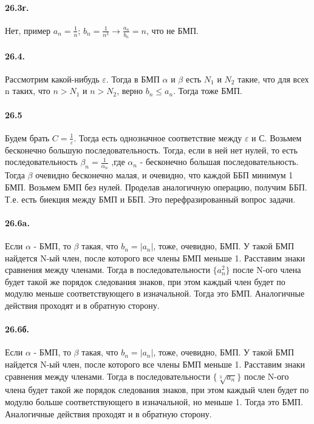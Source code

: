 \documentclass{book}
\begin{document}
\paragraph{26.3г.}
Нет, пример $a_n = \frac{1}{n}$; $b_n =\frac{1}{n^2} \rightarrow \frac{a_n}{b_n} = n$, что не БМП.

\paragraph{26.4.}
Рассмотрим какой-нибудь $\varepsilon$. Тогда в БМП $\alpha$ и $\beta$ есть $N_1$ и $N_2$ такие, что для всех n таких, что $n>N_1$ и $n>N_2$, верно $b_n \le a_n $. Тогда тоже БМП.

\paragraph{26.5}
Будем брать $C = \frac{1}{\varepsilon}$. Тогда есть однозначное соответствие между $\varepsilon$ и С. Возьмем бесконечно большую последовательность. Тогда, если в ней нет нулей, то есть последовательность $\beta_n = \frac{1}{\alpha_n}$ ,где $\alpha_n$ - бесконечно большая последовательность. Тогда $\beta$ очевидно бесконечно малая, и очевидно, что каждой ББП минимум 1 БМП. Возьмем БМП без нулей. Проделав аналогичную операцию, получим ББП. Т.е. есть биекция между БМП и ББП. Это перефразированный вопрос задачи.

\paragraph{26.6a.}
Если $\alpha$ - БМП, то $\beta$ такая, что $b_n = |a_n|$, тоже, очевидно, БМП. У такой БМП найдется N-ый член, после которого все члены БМП меньше 1. Расставим знаки сравнения между членами. Тогда в последовательности $\{a_n^2\}$ после N-ого члена будет такой же порядок следования знаков, при этом каждый член будет по модулю меньше соответствующего в изначальной. Тогда это БМП. Аналогичные действия проходят и в обратную сторону. 

\paragraph{26.6б.}
Если $\alpha$ - БМП, то $\beta$ такая, что $b_n = |a_n|$, тоже, очевидно, БМП. У такой БМП найдется N-ый член, после которого все члены БМП меньше 1. Расставим знаки сравнения между членами. Тогда в последовательности $\{\sqrt[3]{a_n}\}$ после N-ого члена будет такой же порядок следования знаков, при этом каждый член будет по модулю больше соответствующего в изначальной, но меньше 1. Тогда это БМП. Аналогичные действия проходят и в обратную сторону. 
\end{document}
